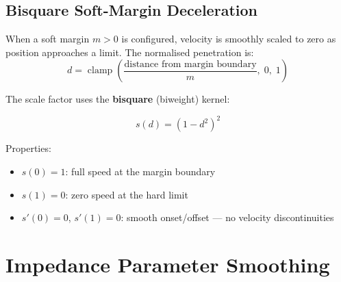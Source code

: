 \documentclass[11pt,a4paper]{article}
\newcommand{\clamp}{\operatorname{clamp}}
\begin{document}
\subsection{Bisquare Soft-Margin Deceleration}
\label{sec:bisquare}

When a soft margin $m > 0$ is configured, velocity is smoothly scaled to zero
as position approaches a limit.  The normalised penetration is:
\[
  d = \clamp\!\left(\frac{\text{distance from margin boundary}}{m},\;0,\;1\right)
\]

The scale factor uses the \textbf{bisquare} (biweight) kernel:

\begin{keqbox}
\begin{equation}
  s(d) = (1 - d^2)^2
  \label{eq:bisquare}
\end{equation}
\end{keqbox}

Properties:
\begin{itemize}[nosep]
  \item $s(0) = 1$: full speed at the margin boundary
  \item $s(1) = 0$: zero speed at the hard limit
  \item $s'(0) = 0$, $s'(1) = 0$: smooth onset/offset --- no velocity discontinuities
\end{itemize}

\begin{center}
\end{center}


\section{Impedance Parameter Smoothing}
\label{sec:smoothing}

\end{document}
